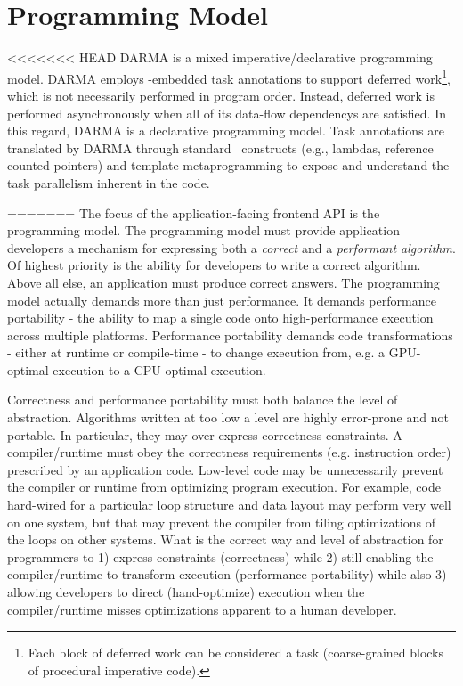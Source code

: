 

\section{Programming Model}
<<<<<<< HEAD
\label{sec:programmingmodel}
\gls{DARMA} is a mixed \gls{imperative}/\gls{declarative} \gls{programming model}.
\gls{DARMA} employs \CC-embedded task annotations to support \gls{deferred
work}\footnote{Each block of
\gls{deferred work} can be considered a task (coarse-grained blocks of \gls{procedural} \gls{imperative} code).},  which is not necessarily performed in program order.   Instead,
\gls{deferred work} is performed asynchronously when all of its \glspl{data-flow dependency} are
satisfied. In this regard,  \gls{DARMA} is a \gls{declarative} \gls{programming
model}.  Task annotations are translated by \gls{DARMA} through standard
\CC\ constructs (e.g., \glspl{lambda}, \glspl{reference counted pointer}) and \gls{template metaprogramming} to
expose and understand the \gls{task parallelism} inherent in the code.

=======
\label{sec:programming_model}
The focus of the application-facing frontend API is the programming model.
The programming model must provide application developers a mechanism for expressing both a \emph{correct} and a \emph{performant algorithm}.
Of highest priority is the ability for developers to write a correct algorithm.
Above all else, an application must produce correct answers.
The programming model actually demands more than just performance. 
It demands performance portability - the ability to map a single code onto high-performance execution across multiple platforms.
Performance portability demands code transformations - either at runtime or compile-time - to change execution from, e.g. a GPU-optimal execution to a CPU-optimal execution.

Correctness and performance portability must both balance the level of abstraction.
Algorithms written at too low a level are highly error-prone and not portable.
In particular, they may over-express correctness constraints.
A compiler/runtime must obey the correctness requirements (e.g. instruction order) prescribed by an application code.
Low-level code may be unnecessarily prevent the compiler or runtime from optimizing program execution.
For example, code hard-wired for a particular loop structure and data layout may perform very well on one system,
but that may prevent the compiler from tiling optimizations of the loops on other systems. 
What is the correct way and level of abstraction for programmers to 1) express constraints (correctness) while 2) still enabling the compiler/runtime to transform execution (performance portability) while also 3) allowing developers to direct (hand-optimize) execution when the compiler/runtime misses optimizations apparent to a human developer. 

